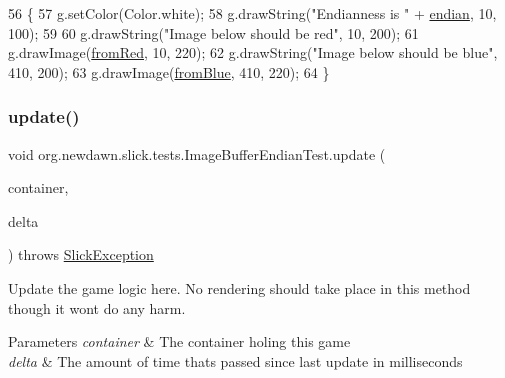 \begin{DoxyCode}
56                                                                                  \{
57       g.setColor(Color.white);
58       g.drawString(\textcolor{stringliteral}{"Endianness is "} + \mbox{\hyperlink{classorg_1_1newdawn_1_1slick_1_1tests_1_1_image_buffer_endian_test_a58c2c0023847f45f85d2b8cb35fea441}{endian}}, 10, 100);
59       
60       g.drawString(\textcolor{stringliteral}{"Image below should be red"}, 10, 200);
61       g.drawImage(\mbox{\hyperlink{classorg_1_1newdawn_1_1slick_1_1tests_1_1_image_buffer_endian_test_afa7ce0c44b9c2f07b05701c00d3abcb5}{fromRed}}, 10, 220);
62       g.drawString(\textcolor{stringliteral}{"Image below should be blue"}, 410, 200);
63       g.drawImage(\mbox{\hyperlink{classorg_1_1newdawn_1_1slick_1_1tests_1_1_image_buffer_endian_test_ab1272c261f070e21da306eb13d42eb9c}{fromBlue}}, 410, 220);
64    \}
\end{DoxyCode}
\mbox{\label{classorg_1_1newdawn_1_1slick_1_1tests_1_1_image_buffer_endian_test_a8f249cc7e62b0c349071fb427bb119fe}} 
\subsubsection{\texorpdfstring{update()}{update()}}
{\footnotesize\ttfamily void org.\+newdawn.\+slick.\+tests.\+Image\+Buffer\+Endian\+Test.\+update (\begin{DoxyParamCaption}\item[{\mbox{\hyperlink{classorg_1_1newdawn_1_1slick_1_1_game_container}{Game\+Container}}}]{container,  }\item[{int}]{delta }\end{DoxyParamCaption}) throws \mbox{\hyperlink{classorg_1_1newdawn_1_1slick_1_1_slick_exception}{Slick\+Exception}}\hspace{0.3cm}{\ttfamily [inline]}}

Update the game logic here. No rendering should take place in this method though it won\textquotesingle{}t do any harm.


\begin{DoxyParams}{Parameters}
{\em container} & The container holing this game \\
\hline
{\em delta} & The amount of time thats passed since last update in milliseconds \\
\hline
\end{DoxyParams}


